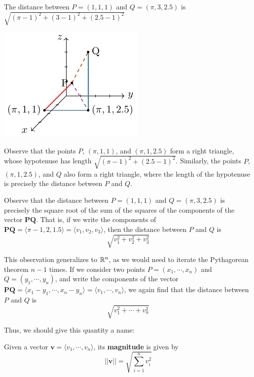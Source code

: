 \begin{example}
    The distance between $P = (1,1,1)$ and $Q = (\pi, 3, 2.5)$  is $\sqrt{(\pi-1)^2+ (3-1)^2 + (2.5-1)^2}$
    
\begin{center}
    \includegraphics{chapters/1-LinearAlgebra/figures/figures-distancePQ.pdf}
\end{center}

Observe that the points $P$, $(\pi, 1, 1)$, and $(\pi, 1, 2.5)$ form a right triangle, whose hypotenuse has length $\sqrt{(\pi-1)^2+(2.5-1)^2}$. Similarly, the points $P$, $(\pi, 1, 2.5)$, and $Q$ also form a right triangle, where the length of the hypotenuse is precisely the distance between $P$ and $Q$.

    
\end{example}

Observe that the distance between $P = (1,1,1)$ and $Q = (\pi, 3, 2.5)$  is precisely the square root of the sum of the squares of the components of the vector $\bm{PQ}$. That is, if we write the components of $\bm{PQ} = \langle \pi-1, 2, 1.5 \rangle = \langle v_1, v_2, v_3 \rangle$, then the distance between $P$ and $Q$ is $$\sqrt{v_1^2 + v_2^2 + v_3^2}$$  

This observation generalizes to $\mathbb{R}^n$, as we would need to iterate the Pythagorean theorem $n-1$ times.  If we consider two points $P = (x_1, \cdots, x_n)$ and $Q = (y_1, \cdots, y_n)$,
and write the components of the vector $\bm{PQ} = \langle x_1-y_1, \cdots, x_n-y_n \rangle = \langle v_1, \cdots, v_n \rangle$, we again find that the distance between $P$ and $Q$ is $$\sqrt{v_1^2 + \cdots + v_n^2}$$

Thus, we should give this quantity a name:

    \begin{definition}
    Given a vector $\bm{v} = \langle v_1, \cdots, v_n \rangle$, its \textbf{magnitude} is given by $$||\bm{v}|| = \sqrt{\sum_{i=1}^n v_i^2}$$
    \end{definition}

